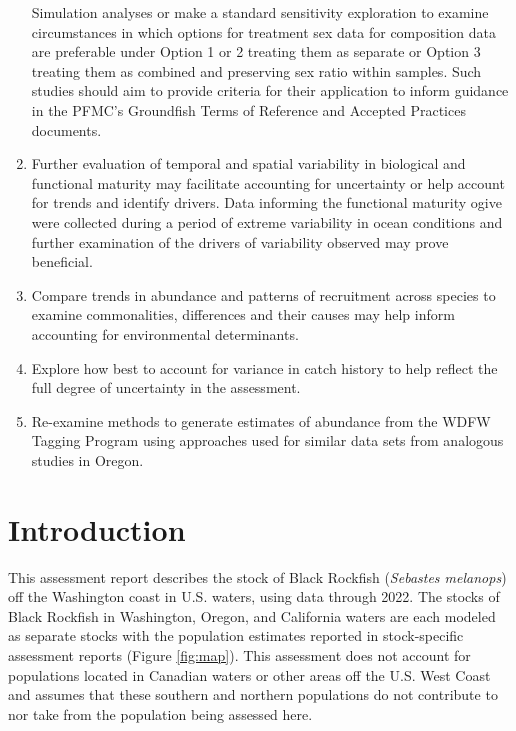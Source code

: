 \documentclass[11pt,
  english,
  letterpaper,
]{article}
\begin{document}
\begin{enumerate}
  Simulation analyses or make a standard sensitivity exploration to examine circumstances in which options for treatment sex data for composition data are preferable under Option 1 or 2 treating them as separate or Option 3 treating them as combined and preserving sex ratio within samples. Such studies should aim to provide criteria for their application to inform guidance in the PFMC's Groundfish Terms of Reference and Accepted Practices documents.
\item
  Further evaluation of temporal and spatial variability in biological and functional maturity may facilitate accounting for uncertainty or help account for trends and identify drivers. Data informing the functional maturity ogive were collected during a period of extreme variability in ocean conditions and further examination of the drivers of variability observed may prove beneficial.
\item
  Compare trends in abundance and patterns of recruitment across species to examine commonalities, differences and their causes may help inform accounting for environmental determinants.
\item
  Explore how best to account for variance in catch history to help reflect the full degree of uncertainty in the assessment.
\item
  Re-examine methods to generate estimates of abundance from the WDFW Tagging Program using approaches used for similar data sets from analogous studies in Oregon.
\end{enumerate}

\vspace{500cm}

\pagebreak
\setlength{\parskip}{5mm plus1mm minus1mm}
\setcounter{page}{1}
\renewcommand{\thefigure}{\arabic{figure}}
\renewcommand{\thetable}{\arabic{table}}
\setcounter{table}{0}
\setcounter{figure}{0}

\hypertarget{introduction}{%
\section{Introduction}\label{introduction}}

This assessment report describes the stock of Black Rockfish (\emph{Sebastes melanops}) off the Washington coast in U.S. waters, using data through 2022. The stocks of Black Rockfish in Washington, Oregon, and California waters are each modeled as separate stocks with the population estimates reported in stock-specific assessment reports (Figure \ref{fig:map}). This assessment does not account for populations located in Canadian waters or other areas off the U.S. West Coast and assumes that these southern and northern populations do not contribute to nor take from the population being assessed here.
\end{document}
